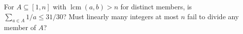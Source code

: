 For $A\subseteq[1,n]$ with $\operatorname{lcm}(a,b)>n$ for distinct members, is $\sum_{a\in A}1/a\leq31/30$? Must linearly many integers at most $n$ fail to divide any member of $A$?

